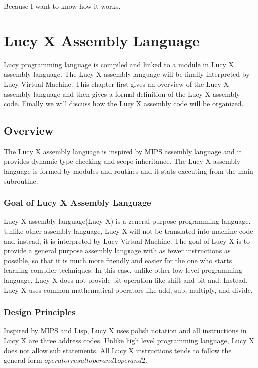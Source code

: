 \begin{savequote}[75mm]
Because I want to know how it works.
\end{savequote}

\chapter{Lucy X Assembly Language}
Lucy programming language is compiled and linked to a module in Lucy X assembly language. The Lucy X assembly language will be finally interpreted by Lucy Virtual Machine. This chapter first gives an overview of the Lucy X assembly language and then gives a formal definition of the Lucy X assembly code. Finally we will discuss how the Lucy X assembly code will be organized.

\section{Overview}
The Lucy X assembly language is inspired by MIPS assembly language and it provides dynamic type checking and scope inheritance. The Lucy X assembly language is formed by modules and routines and it stats executing from the main subroutine.

\subsection{Goal of Lucy X Assembly Language}
Lucy X assembly language(Lucy X) is a general purpose programming language. Unlike other assembly language, Lucy X will not be translated into machine code and instead, it is interpreted by Lucy Virtual Machine. The goal of Lucy X is to provide a general purpose assembly language with as fewer instructions as possible, so that it is much more friendly and easier for the one who starts learning compiler techniques. In this case, unlike other low level programming language, Lucy X does not provide bit operation like shift and bit and. Instead, Lucy X uses common mathematical operators like add, sub, multiply, and divide.

\subsection{Design Principles}
Inspired by MIPS and Lisp, Lucy X uses polish notation and all instructions in Lucy X are three address codes. Unlike high level programming language, Lucy X does not allow sub statements. All Lucy X instructions tends to follow the general form $operator result operand1 operand2$.


